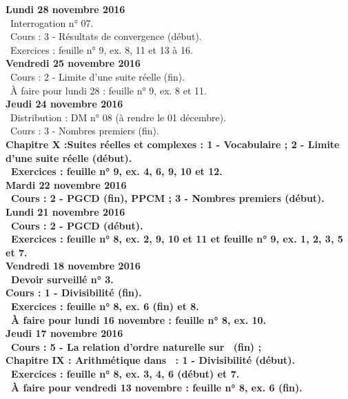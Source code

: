 \documentclass[12pt,a4paper]{article}
\begin{document}
\noindent\textbf{Lundi 28 novembre 2016} \\
\bu\ Interrogation n° 07.\\
\bu\ Cours : 3 - Résultats de convergence (début).\\
\bu\ Exercices : feuille n° 9, ex. 8, 11 et 13 à 16.\vspace{.4cm}\\

\noindent\textbf{Vendredi 25 novembre 2016}\\
\bu\ Cours : 2 - Limite d'une suite réelle (fin).\\
\bu\ À faire pour lundi 28 : feuille n° 9, ex. 8 et 11.\vspace{.4cm}\\

\noindent\textbf{Jeudi 24 novembre 2016}\\
\bu\ Distribution : DM n° 08 (à rendre le 01 décembre).\\
\bu\ Cours : 3 - Nombres premiers (fin).\\
\bf Chapitre X :\rm Suites réelles et complexes : 1 - Vocabulaire ; 2 - Limite 
d'une suite réelle (début).\\
\bu\ Exercices : feuille n° 9, ex. 4, 6, 9, 10 et 12.\vspace{.4cm}\\

\noindent\textbf{Mardi 22 novembre 2016}\\
\bu\ Cours : 2 - PGCD (fin), PPCM ; 3 - Nombres premiers (début).\vspace{.4cm}\\
   
\noindent\textbf{Lundi 21 novembre 2016}\\
\bu\ Cours : 2 - PGCD (début).\\
\bu\ Exercices : feuille n° 8, ex. 2, 9, 10 et 11 et feuille n° 9, ex. 1, 2, 3, 5 et 7.\vspace{.4cm}\\

\noindent\textbf{Vendredi 18 novembre 2016}\\
\bu\ Devoir surveillé n° 3.\\
\bf Cours : 1 - Divisibilité (fin).\\
\bu\ Exercices : feuille n° 8, ex. 6 (fin) et 8.\\
\bu\ À faire pour lundi 16 novembre : feuille n° 8, ex. 10.\vspace{.4cm}\\
 
\noindent\textbf{Jeudi 17 novembre 2016}\\
\bu\ Cours : 5 - La relation d'ordre naturelle sur \R\ (fin) ;\\
\bf Chapitre IX \rm : Arithmétique dans \Z\ : 1 - Divisibilité (début).\\
\bu\ Exercices : feuille n° 8, ex. 3, 4, 6 (début) et 7.\\
\bu\ À faire pour vendredi 13 novembre : feuille n° 8, ex. 6 (fin).\vspace{.4cm}\\
\end{document}
